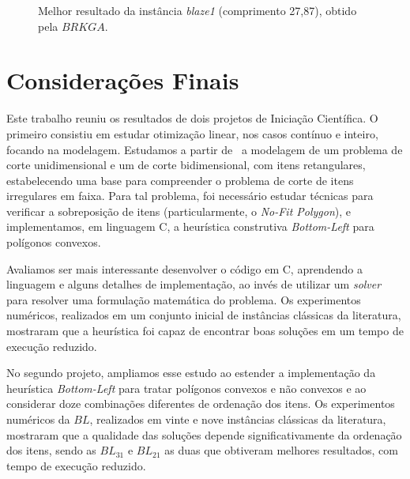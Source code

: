 \documentclass{article}
\newcommand{\corC}{LimeGreen}
\newcommand{\corD}{Mahogany}
\newcommand{\corE}{OrangeRed}
\begin{document}
\begin{figure}[H]
\begin{center}
    \caption{Melhor resultado da instância {\it blaze1} (comprimento 27,87), obtido pela $BRKGA$.}
    \label{fig:f20}
    \end{center}
\end{figure}




\section{Considerações Finais} \label{sec:cons_finais}

Este trabalho reuniu os resultados de dois projetos de Iniciação Científica. O primeiro consistiu em estudar otimização linear, nos casos contínuo e inteiro, focando na modelagem. Estudamos a partir de~\cite{arenales} a modelagem de um problema de corte unidimensional e um de corte bidimensional, com itens retangulares, estabelecendo uma base para compreender o problema de corte de itens irregulares em faixa. Para tal problema, foi necessário estudar técnicas para verificar a sobreposição de itens (particularmente, o {\it No-Fit Polygon}), e implementamos, em linguagem C, a heurística construtiva {\it Bottom-Left} para polígonos convexos. 

Avaliamos ser mais interessante desenvolver o código em C, aprendendo a linguagem e alguns detalhes de implementação, ao invés de utilizar um {\it solver} para resolver uma formulação matemática do problema. Os experimentos numéricos, realizados em um conjunto inicial de instâncias clássicas da literatura, mostraram que a heurística foi capaz de encontrar boas soluções em um tempo de execução reduzido.

No segundo projeto, ampliamos esse estudo ao estender a implementação da heurística {\it Bottom-Left} para tratar polígonos convexos e não convexos e ao considerar doze combinações diferentes de ordenação dos itens. Os experimentos numéricos da $BL$, realizados em vinte e nove instâncias clássicas da literatura, mostraram que a qualidade das soluções depende significativamente da ordenação dos itens, sendo as $BL_{31}$ e $BL_{21}$ as duas que obtiveram melhores resultados, com tempo de execução reduzido.
\end{document}
